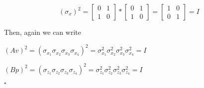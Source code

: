 \documentclass[12pt]{report}
\begin{document}
\begin{minipage}{1 \textwidth}
		
		\[
		\text{$( \sigma_x )^{2}$} = 
		\begin{bmatrix}
			0 & 1 \\
			1 & 0
		\end{bmatrix} *
		\begin{bmatrix}
			0 & 1 \\
			1 & 0
		\end{bmatrix} =
		\begin{bmatrix}
			1 & 0 \\
			0 & 1
		\end{bmatrix}
		= \text{$I$}
		\]\newline
		
		
		Then, again we can write\newline
		
		\begin{center}
			$(Av)^{2} = (\sigma_{x_1} \sigma_{x_2} \sigma_{x_3} \sigma_{x_4})^{2} = \sigma_{x_1}^2 \sigma_{x_2}^2 \sigma_{x_3}^2 \sigma_{x_4}^2 = I$ \newline
			
			$(Bp)^{2} = (\sigma_{z_1} \sigma_{z_2} \sigma_{z_3} \sigma_{z_4})^{2} = \sigma_{z_1}^2 \sigma_{z_2}^2 \sigma_{z_3}^2 \sigma_{z_4}^2 = I$\newline
		\end{center}
		
		\hfill $\square$\newline
	\end{minipage}
	
\end{document}
